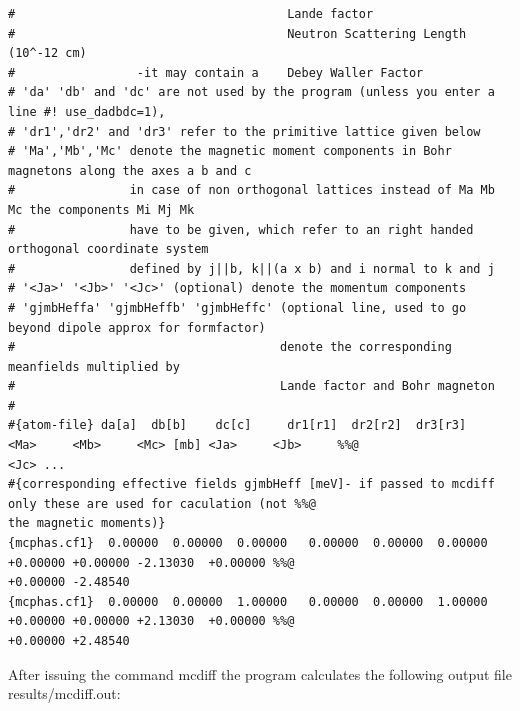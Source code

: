 {\begin{verbatim}
#                                      Lande factor
#                                      Neutron Scattering Length (10^-12 cm) 
#                 -it may contain a    Debey Waller Factor
# 'da' 'db' and 'dc' are not used by the program (unless you enter a line #! use_dadbdc=1), 
# 'dr1','dr2' and 'dr3' refer to the primitive lattice given below
# 'Ma','Mb','Mc' denote the magnetic moment components in Bohr magnetons along the axes a b and c
#                in case of non orthogonal lattices instead of Ma Mb Mc the components Mi Mj Mk
#                have to be given, which refer to an right handed orthogonal coordinate system 
#                defined by j||b, k||(a x b) and i normal to k and j
# '<Ja>' '<Jb>' '<Jc>' (optional) denote the momentum components 
# 'gjmbHeffa' 'gjmbHeffb' 'gjmbHeffc' (optional line, used to go beyond dipole approx for formfactor)
#                                     denote the corresponding meanfields multiplied by 
#                                     Lande factor and Bohr magneton 
#
#{atom-file} da[a]  db[b]    dc[c]     dr1[r1]  dr2[r2]  dr3[r3]   <Ma>     <Mb>     <Mc> [mb] <Ja>     <Jb>     %%@
<Jc> ...
#{corresponding effective fields gjmbHeff [meV]- if passed to mcdiff only these are used for caculation (not %%@
the magnetic moments)}
{mcphas.cf1}  0.00000  0.00000  0.00000   0.00000  0.00000  0.00000   +0.00000 +0.00000 -2.13030  +0.00000 %%@
+0.00000 -2.48540
{mcphas.cf1}  0.00000  0.00000  1.00000   0.00000  0.00000  1.00000   +0.00000 +0.00000 +2.13030  +0.00000 %%@
+0.00000 +2.48540

\end{verbatim}
}

After issuing the command {\prg mcdiff} 
the program calculates the following output file {\prg results/mcdiff.out}:

